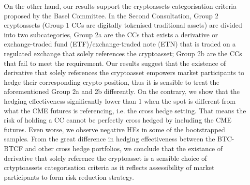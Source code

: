 On the other hand, our results support the cryptoassets categorisation criteria proposed by the Basel Committee.
In the Second Consultation, Group 2 cryptoassets (Group 1 CCs are digitally tokenised traditional assets) are divided into two subcategories,
Group 2a are the CCs that exists a derivative or exchange-traded fund (ETF)/exchange-traded note (ETN) that is traded on a regulated exchange that solely references the cryptoasset;
Group 2b are the CCs that fail to meet the requirement.
Our results suggest that the existence of derivative that solely references the cryptoasset empowers market participants to hedge their corresponding crypto position,
thus it is sensible to treat the aforementioned Group 2a and 2b differently.
On the contrary, we show that the hedging effectiveness significantly lower than 1 when the spot is different from what the CME futures is referencing, i.e. the cross hedge setting.
That means the risk of holding a CC cannot be perfectly cross hedged by including the CME futures.
Even worse, we observe negative HEs in some of the bootstrapped samples.
From the great difference in hedging effectiveness between the BTC-BTCF and other cross hedge portfolios,
we conclude that the existance of derivative that solely reference the cryptoasset is a sensible choice of crtyptoassets categorisation criteria
as it reflects assessibility of market participants to form risk reduction strategy.

